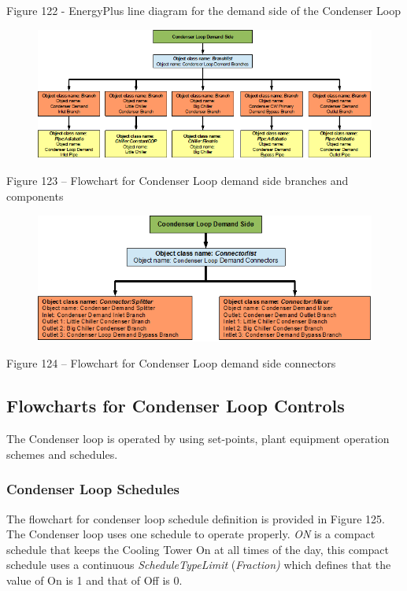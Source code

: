 Figure 122 - EnergyPlus line diagram for the demand side of the Condenser Loop

\begin{figure}[htbp]
\centering
\includegraphics{media/image123.png}
\caption{}
\end{figure}

Figure 123 -- Flowchart for Condenser Loop demand side branches and components

\begin{figure}[htbp]
\centering
\includegraphics{media/image124.png}
\caption{}
\end{figure}

Figure 124 -- Flowchart for Condenser Loop demand side connectors

\subsection{Flowcharts for Condenser Loop Controls}\label{flowcharts-for-condenser-loop-controls-000}

The Condenser loop is operated by using set-points, plant equipment operation schemes and schedules.

\subsubsection{Condenser Loop Schedules}\label{condenser-loop-schedules-000}

The flowchart for condenser loop schedule definition is provided in Figure 125. The Condenser loop uses one schedule to operate properly. \emph{ON} is a compact schedule that keeps the Cooling Tower On at all times of the day, this compact schedule uses a continuous \emph{ScheduleTypeLimit} (\emph{Fraction)} which defines that the value of On is 1 and that of Off is 0.

